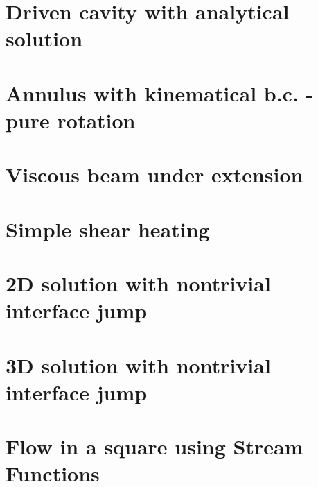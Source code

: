 \section{Driven cavity with analytical solution \label{sec:ldc_anal}}


\section{Annulus with kinematical b.c. - pure rotation} \label{ss:ankbc}


\section{Viscous beam under extension \label{ss:viscousbeamext}}


\section{Simple shear heating} \label{ss:shearheating} 


\section{2D solution with nontrivial interface jump} \label{ss:jump2D} 


\section{3D solution with nontrivial interface jump} \label{ss:jump3D} 


\section{Flow in a square using Stream Functions \label{ss:square_streamfct} }


